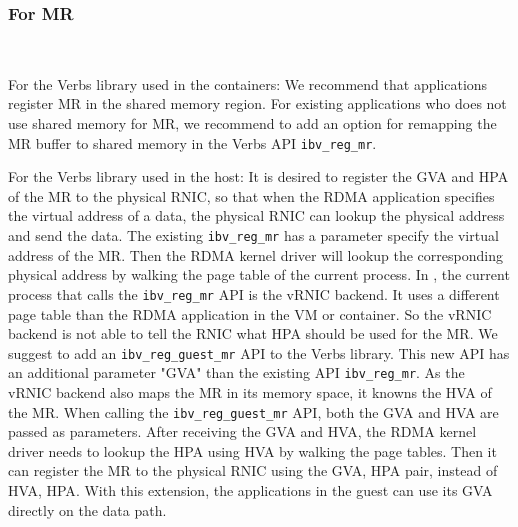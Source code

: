\subsubsection{\textbf{For MR}}
\
\noindent

For the Verbs library used in the containers: We recommend that applications register MR in the shared memory region. For existing applications who does not use shared memory for MR, we recommend to add an option for remapping the MR buffer to shared memory in the Verbs API \texttt{ibv\_reg\_mr}.

For the Verbs library used in the host: It is desired to register the GVA and HPA of the MR to the physical RNIC, so that when the RDMA application specifies the virtual address of a data, the physical RNIC can lookup the physical address and send the data.
The existing \texttt{ibv\_reg\_mr} has a parameter specify the virtual address of the MR. Then the RDMA kernel driver will lookup the corresponding physical address by walking the page table of the current process.
In \sys, the current process that calls the \texttt{ibv\_reg\_mr} API is the vRNIC backend. It uses a different page table than the RDMA application in the VM or container. So the vRNIC backend is not able to tell the RNIC what HPA should be used for the MR.
We suggest to add an \texttt{ibv\_reg\_guest\_mr} API to the Verbs library. This new API has an additional parameter "GVA" than the existing API \texttt{ibv\_reg\_mr}. As the vRNIC backend also maps the MR in its memory space, it knowns the HVA of the MR. When calling the \texttt{ibv\_reg\_guest\_mr} API, both the GVA and HVA are passed as parameters. After receiving the GVA and HVA, the RDMA kernel driver needs to lookup the HPA using HVA by walking the page tables. Then it can register the MR to the physical RNIC using the {GVA, HPA} pair, instead of {HVA, HPA}.
With this extension, the applications in the guest can use its GVA directly on the data path.
